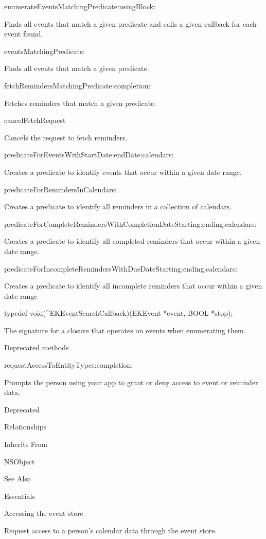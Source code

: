 \documentclass{article}
\begin{document}
\textminus enumerateEventsMatchingPredicate:usingBlock:

Finds all events that match a given predicate and calls a given callback for each event found.

\textminus eventsMatchingPredicate:

Finds all events that match a given predicate.

\textminus fetchRemindersMatchingPredicate:completion:

Fetches reminders that match a given predicate.

\textminus cancelFetchRequest

Cancels the request to fetch reminders.

\textminus predicateForEventsWithStartDate:endDate:calendars:

Creates a predicate to identify events that occur within a given date range.

\textminus predicateForRemindersInCalendars:

Creates a predicate to identify all reminders in a collection of calendars.

\textminus predicateForCompleteRemindersWithCompletionDateStarting:ending:calendars:

Creates a predicate to identify all completed reminders that occur within a given date range.

\textminus predicateForIncompleteRemindersWithDueDateStarting:ending:calendars:

Creates a predicate to identify all incomplete reminders that occur within a given date range

typedef void(^EKEventSearchCallback)(EKEvent *event, BOOL *stop);

The signature for a closure that operates on events when enumerating them.

Deprecated methods

\textminus requestAccessToEntityTypes:completion:

Prompts the person using your app to grant or deny access to event or reminder data.

Deprecated

Relationships

Inherits From

NSObject

See Also

Essentials

\href{}{}Accessing the event store

Request access to a person's calendar data through the event store.

\newpage
\end{document}
